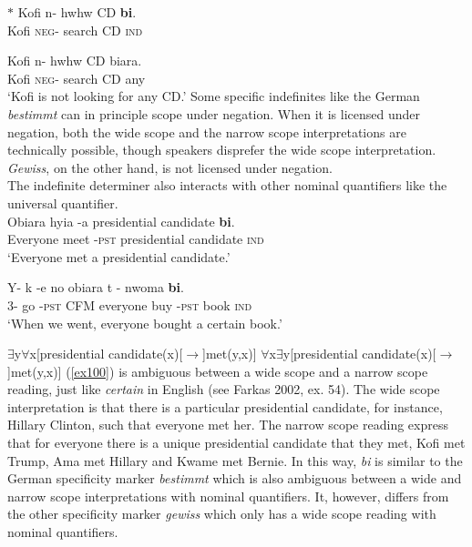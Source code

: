 \documentclass[output=paper,
modfonts
]{langsci/langscibook}
\begin{document}
  \ea \label{ex12}
\gll $\ast$ Kofi n- hwhw CD \textbf{bi}. \\
    {}  Kofi \textsc{neg}-  search CD \textsc{ind} \\
\glt 

\ex\label{ex13}
\gll  Kofi n- hwhw CD biara.\\
Kofi \textsc{neg}-  search CD any \\
\glt `Kofi is not looking for any CD.'
\z \z Some specific indefinites like the German \emph{bestimmt} can in principle scope under negation. When it is licensed under negation, both the wide scope and the narrow scope interpretations are technically possible, though speakers disprefer the wide scope interpretation. \emph{Gewiss}, on the other hand, is not licensed under negation. \\
The indefinite determiner also interacts with other nominal quantifiers like the universal quantifier. 
\ea 
{}\\
  \ea\label{ex100}
\gll Obiara hyia -a presidential candidate  \textbf{bi}. \\
    Everyone meet -\textsc{pst} presidential candidate \textsc{ind} \\
\glt `Everyone met a presidential candidate.'

\ex\label{ex15}
\gll  Y- k -e no obiara t -  nwoma \textbf{bi}.\\
3{\pl}- go -\textsc{pst}  CFM everyone buy -\textsc{pst} book \textsc{ind} \\
\glt `When we went, everyone bought a certain book.'
\z \z
 
 \ea
 \ea
$\exists$y$\forall$x[presidential candidate(x)[$\rightarrow$]met(y,x)]
\ex $\forall$x$\exists$y[presidential candidate(x)[$\rightarrow$]met(y,x)] 
\z\z
(\ref{ex100}) is ambiguous between a wide scope and a narrow scope reading, just like \emph{certain} in English  (see Farkas 2002, ex. 54). The wide scope interpretation is that there is a particular presidential candidate, for instance, Hillary Clinton, such that everyone met her. The narrow scope reading express that for everyone there is a unique presidential candidate that they met, Kofi met Trump, Ama met Hillary and Kwame met Bernie. In this way, \emph{bi} is similar to the German specificity marker \emph{bestimmt} which is also ambiguous between a wide and narrow scope interpretations with nominal quantifiers. It, however, differs from the other specificity marker \emph{gewiss} which only has a wide scope reading with nominal quantifiers.               
  
\end{document}
